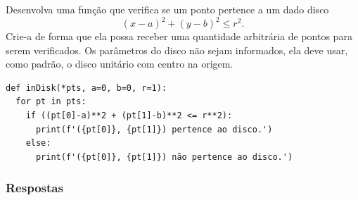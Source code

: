 \begin{exer}
  Desenvolva uma função que verifica se um ponto pertence a um dado disco
  \begin{equation}
    (x-a)^2 + (y-b)^2 \leq r^2.
  \end{equation}
  Crie-a de forma que ela possa receber uma quantidade arbitrária de pontos para serem verificados. Os parâmetros do disco não sejam informados, ela deve usar, como padrão, o disco unitário com centro na origem.
\end{exer}
\begin{resp}

\begin{lstlisting}
def inDisk(*pts, a=0, b=0, r=1):
  for pt in pts:
    if ((pt[0]-a)**2 + (pt[1]-b)**2 <= r**2):
      print(f'({pt[0]}, {pt[1]}) pertence ao disco.')
    else:
      print(f'({pt[0]}, {pt[1]}) não pertence ao disco.')
\end{lstlisting}

\end{resp}

\ifisbook
\subsubsection{Respostas}
\shipoutAnswer
\fi

